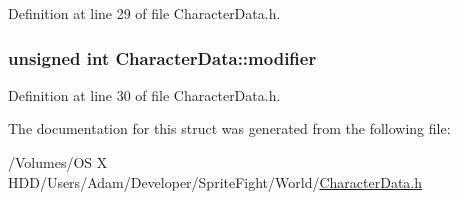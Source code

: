 Definition at line 29 of file Character\-Data.\-h.

\hypertarget{struct_character_data_adc89389cfd62de262b8fa380703a8705}{
\subsubsection[{modifier}]{\setlength{\rightskip}{0pt plus 5cm}unsigned int Character\-Data\-::modifier\hspace{0.3cm}{\ttfamily [protected]}}}\label{struct_character_data_adc89389cfd62de262b8fa380703a8705}


Definition at line 30 of file Character\-Data.\-h.



The documentation for this struct was generated from the following file\-:\begin{DoxyCompactItemize}
\item 
/\-Volumes/\-O\-S X H\-D\-D/\-Users/\-Adam/\-Developer/\-Sprite\-Fight/\-World/\hyperlink{_character_data_8h}{Character\-Data.\-h}\end{DoxyCompactItemize}
